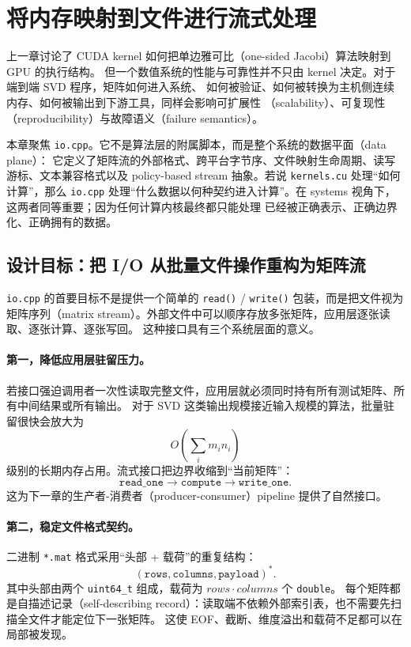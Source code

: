 \section{将内存映射到文件进行流式处理}

上一章讨论了 CUDA kernel 如何把单边雅可比（one-sided Jacobi）算法映射到 GPU 的执行结构。
但一个数值系统的性能与可靠性并不只由 kernel 决定。对于端到端 SVD 程序，矩阵如何进入系统、
如何被验证、如何被转换为主机侧连续内存、如何被输出到下游工具，同样会影响可扩展性
（scalability）、可复现性（reproducibility）与故障语义（failure semantics）。

本章聚焦 \texttt{io.cpp}。它不是算法层的附属脚本，而是整个系统的数据平面（data plane）：
它定义了矩阵流的外部格式、跨平台字节序、文件映射生命周期、读写游标、文本兼容格式以及
policy-based stream 抽象。若说 \texttt{kernels.cu} 处理“如何计算”，那么 \texttt{io.cpp}
处理“什么数据以何种契约进入计算”。在 systems 视角下，这两者同等重要；因为任何计算内核最终都只能处理
已经被正确表示、正确边界化、正确拥有的数据。

\subsection{设计目标：把 I/O 从批量文件操作重构为矩阵流}

\texttt{io.cpp} 的首要目标不是提供一个简单的 \texttt{read()} / \texttt{write()} 包装，而是把文件视为
矩阵序列（matrix stream）。外部文件中可以顺序存放多张矩阵，应用层逐张读取、逐张计算、逐张写回。
这种接口具有三个系统层面的意义。

\paragraph{第一，降低应用层驻留压力。}
若接口强迫调用者一次性读取完整文件，应用层就必须同时持有所有测试矩阵、所有中间结果或所有输出。
对于 SVD 这类输出规模接近输入规模的算法，批量驻留很快会放大为
\[
    O\left(\sum_i m_i n_i\right)
\]
级别的长期内存占用。流式接口把边界收缩到“当前矩阵”：
\[
    \texttt{read\_one} \rightarrow \texttt{compute} \rightarrow \texttt{write\_one}.
\]
这为下一章的生产者-消费者（producer-consumer）pipeline 提供了自然接口。

\paragraph{第二，稳定文件格式契约。}
二进制 \texttt{*.mat} 格式采用“头部 + 载荷”的重复结构：
\[
    (\texttt{rows},\texttt{columns},\texttt{payload})^*.
\]
其中头部由两个 \texttt{uint64\_t} 组成，载荷为 $rows\cdot columns$ 个 \texttt{double}。
每个矩阵都是自描述记录（self-describing record）：读取端不依赖外部索引表，也不需要先扫描全文件才能定位下一张矩阵。
这使 EOF、截断、维度溢出和载荷不足都可以在局部被发现。

